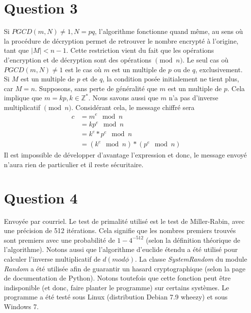\documentclass[letterpaper,12pt]{scrartcl}
\begin{document}
	\section*{Question 3}
		Si $PGCD(m,N) \neq 1, N = pq$, l'algorithme fonctionne quand même, au sens où la procédure de décryption permet de retrouver le nombre encrypté à l'origine, tant que $|M| < n-1$. Cette restriction vient du fait que les opérations d'encryption et de décryption sont des opérations $\pmod n$. Le seul cas où $PGCD(m,N) \neq 1$ est le cas où $m$ est un multiple de $p$ ou de $q$, exclusivement. Si $M$ est un multiple de $p$ et de $q$, la condition posée initialement ne tient plus, car $M = n$.  Supposons, sans perte de généralité que $m$ est un multiple de $p$. Cela implique que $m = kp, k \in \mathbb{Z}^*$. Nous savons aussi que $m$ n'a pas d'inverse multiplicatif $\pmod n$. Considérant cela, le message chiffré sera 
		\begin{align*}
		c & = m^e \mod n \\
		  & = kp^e \mod n \\
		  & = k^e * p^e \mod n \\
		  & = (k^e \mod n) *  (p^e \mod n)
		\end{align*}
Il est impossible de développer d'avantage l'expression et donc, le message envoyé n'aura rien de particulier et il reste sécuritaire.
	\section*{Question 4}
		Envoyée par courriel. Le test de primalité utilisé est le test de Miller-Rabin, avec une précision de 512 itérations. Cela signifie que les nombres premiers trouvés sont premiers avec une probabilité de $1-4^{-512}$ (selon la définition théorique de l'algorithme). Notons aussi que l'algorithme d'euclide étendu a été utilisé pour calculer l'inverse multiplicatif de $d (mod \phi)$. La classe \textit{SystemRandom} du module \textit{Random} a été utilisée afin de guarantir un hasard cryptographique (selon la page de documentation de Python). Notons toutefois que cette fonction peut être indisponible (et donc, faire planter le programme) sur certains systèmes. Le programme a été testé sous Linux (distribution Debian 7.9 wheezy) et sous Windows 7.
\end{document}
